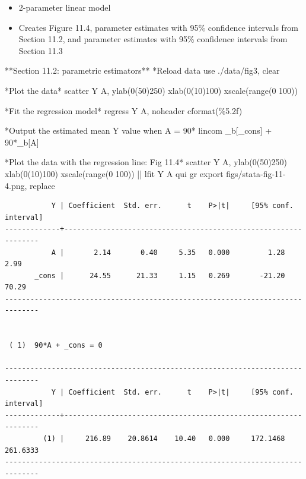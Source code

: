 \documentclass[
  10pt,
  a4paper,
]{book}
\newenvironment{Shaded}{\begin{snugshade}}{\end{snugshade}}
\newcommand{\BaseNTok}[1]{\textcolor[rgb]{0.68,0.00,0.00}{#1}}
\newcommand{\DataTypeTok}[1]{\textcolor[rgb]{0.68,0.00,0.00}{#1}}
\newcommand{\KeywordTok}[1]{\textcolor[rgb]{0.00,0.46,0.62}{#1}}
\newcommand{\NormalTok}[1]{\textcolor[rgb]{0.00,0.46,0.62}{#1}}
\newcommand{\OtherTok}[1]{\textcolor[rgb]{0.00,0.46,0.62}{#1}}
\providecommand{\tightlist}{%
  \setlength{\itemsep}{0pt}\setlength{\parskip}{0pt}}
\begin{document}
\begin{itemize}
\tightlist
\item
  2-parameter linear model
\item
  Creates Figure 11.4, parameter estimates with 95\% confidence intervals from Section 11.2, and parameter estimates with 95\% confidence intervals from Section 11.3
\end{itemize}

\begin{Shaded}
\begin{Highlighting}[]
\NormalTok{**Section 11.2: parametric estimators**}
\NormalTok{*Reload }\KeywordTok{data}
\KeywordTok{use}\NormalTok{ ./}\KeywordTok{data}\NormalTok{/fig3, }\KeywordTok{clear}

\NormalTok{*Plot the }\KeywordTok{data}\NormalTok{*}
\KeywordTok{scatter}\NormalTok{ Y A, ylab(0(50)250) xlab(0(10)100) }\BaseNTok{xscale}\NormalTok{(}\KeywordTok{range}\NormalTok{(0 100))}

\NormalTok{*Fit the regression }\KeywordTok{model}\NormalTok{*}
\KeywordTok{regress}\NormalTok{ Y A, }\KeywordTok{noheader}\NormalTok{ cformat(\%5.2f)}

\NormalTok{*Output the estimated }\KeywordTok{mean}\NormalTok{ Y }\OtherTok{value}\NormalTok{ when A = 90*}
\KeywordTok{lincom}\NormalTok{ \_b[}\DataTypeTok{\_cons}\NormalTok{] + 90*\_b[A]}

\NormalTok{*Plot the }\KeywordTok{data}\NormalTok{ with the regression }\KeywordTok{line}\NormalTok{: Fig 11.4*}
\KeywordTok{scatter}\NormalTok{ Y A, ylab(0(50)250) xlab(0(10)100) }\BaseNTok{xscale}\NormalTok{(}\KeywordTok{range}\NormalTok{(0 100)) || }\KeywordTok{lfit}\NormalTok{ Y A}
\KeywordTok{qui} \KeywordTok{gr} \KeywordTok{export}\NormalTok{ figs/stata{-}fig{-}11{-}4.png, }\KeywordTok{replace}
\end{Highlighting}
\end{Shaded}

\begin{verbatim}
           Y | Coefficient  Std. err.      t    P>|t|     [95% conf. interval]
-------------+----------------------------------------------------------------
           A |       2.14       0.40     5.35   0.000         1.28        2.99
       _cons |      24.55      21.33     1.15   0.269       -21.20       70.29
------------------------------------------------------------------------------


 ( 1)  90*A + _cons = 0

------------------------------------------------------------------------------
           Y | Coefficient  Std. err.      t    P>|t|     [95% conf. interval]
-------------+----------------------------------------------------------------
         (1) |     216.89    20.8614    10.40   0.000     172.1468    261.6333
------------------------------------------------------------------------------
\end{verbatim}
\end{document}
